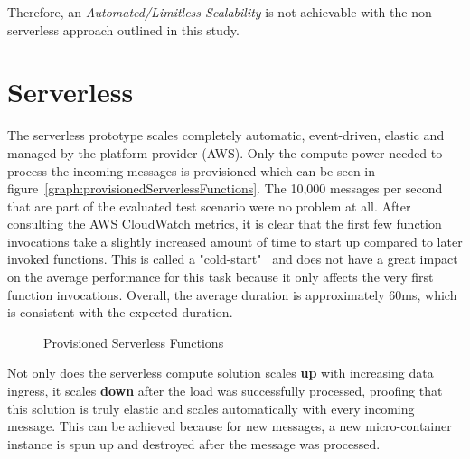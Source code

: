 Therefore, an \textit{Automated/Limitless Scalability} is not achievable with the non-serverless approach outlined in this study. 

\section{Serverless}\label{chp:suitSL}

The serverless prototype scales completely automatic, event-driven, elastic and managed by the platform provider (AWS). Only the compute power needed to process the incoming messages is provisioned which can be seen in figure~\vref{graph:provisionedServerlessFunctions}. The 10,000 messages per second that are part of the evaluated test scenario were no problem at all. After consulting the AWS CloudWatch metrics, it is clear that the first few function invocations take a slightly increased amount of time to start up compared to later invoked functions. This is called a "cold-start"~ and does not have a great impact on the average performance for this task because it only affects the very first function invocations. Overall, the average duration is approximately 60ms, which is consistent with the expected duration. 

\begin{figure}[ht]
    \centering
    \caption {Provisioned Serverless Functions}
    \label{graph:provisionedServerlessFunctions}
\end{figure}

Not only does the serverless compute solution scales \textbf{up} with increasing data ingress, it scales \textbf{down} after the load was successfully processed, proofing that this solution is truly elastic and scales automatically with every incoming message. This can be achieved because for new messages, a new micro-container instance is spun up and destroyed after the message was processed. 


